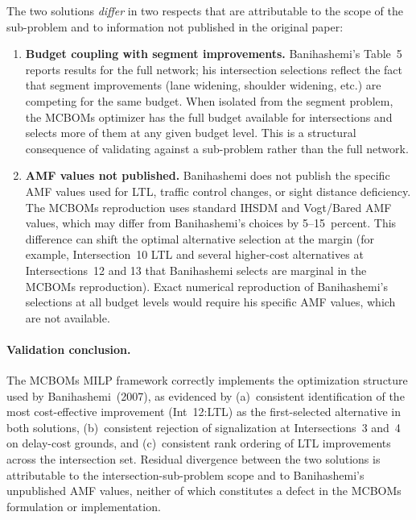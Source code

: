 The two solutions \emph{differ} in two respects that are attributable to
the scope of the sub-problem and to information not published in the
original paper:

\begin{enumerate}[leftmargin=2em, itemsep=4pt]
  \item \textbf{Budget coupling with segment improvements.} Banihashemi's
    Table~5 reports results for the full network; his intersection
    selections reflect the fact that segment improvements (lane widening,
    shoulder widening, etc.) are competing for the same budget. When
    isolated from the segment problem, the MCBOMs optimizer has the full
    budget available for intersections and selects more of them at any given
    budget level. This is a structural consequence of validating against a
    sub-problem rather than the full network.
  \item \textbf{AMF values not published.} Banihashemi does not publish the
    specific AMF values used for LTL, traffic control changes, or sight
    distance deficiency. The MCBOMs reproduction uses standard IHSDM and
    Vogt/Bared AMF values, which may differ from Banihashemi's choices by
    5--15~percent. This difference can shift the optimal alternative
    selection at the margin (for example, Intersection~10 LTL and several
    higher-cost alternatives at Intersections~12 and 13 that Banihashemi
    selects are marginal in the MCBOMs reproduction). Exact numerical
    reproduction of Banihashemi's selections at all budget levels would
    require his specific AMF values, which are not available.
\end{enumerate}

\paragraph{Validation conclusion.} The MCBOMs MILP framework correctly
implements the optimization structure used by Banihashemi~(2007), as
evidenced by (a)~consistent identification of the most cost-effective
improvement (Int~12:LTL) as the first-selected alternative in both
solutions, (b)~consistent rejection of signalization at Intersections~3
and~4 on delay-cost grounds, and (c)~consistent rank ordering of LTL
improvements across the intersection set. Residual divergence between the
two solutions is attributable to the intersection-sub-problem scope and to
Banihashemi's unpublished AMF values, neither of which constitutes a defect
in the MCBOMs formulation or implementation.

